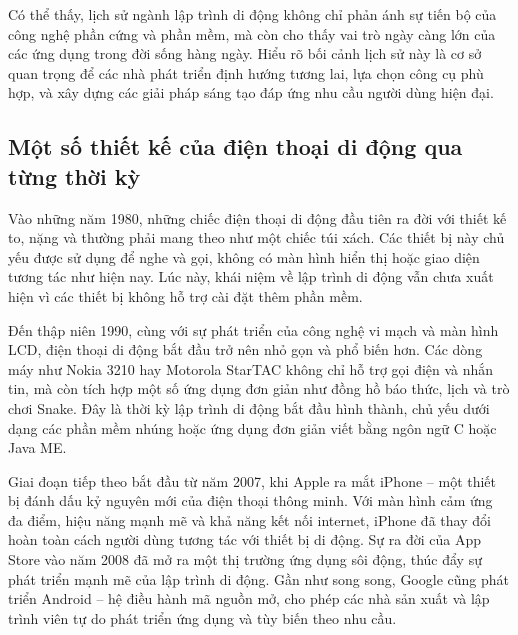 \begin{flushleft}
  \hspace*{0.8cm}Có thể thấy, lịch sử ngành lập trình di động không chỉ phản ánh sự tiến bộ của công nghệ phần cứng và phần mềm, mà còn cho thấy vai trò ngày càng lớn của các ứng dụng trong đời sống hàng ngày. Hiểu rõ bối cảnh lịch sử này là cơ sở quan trọng để các nhà phát triển định hướng tương lai, lựa chọn công cụ phù hợp, và xây dựng các giải pháp sáng tạo đáp ứng nhu cầu người dùng hiện đại.
\end{flushleft}

\subsection{Một số thiết kế của điện thoại di động qua từng thời kỳ}
\renewcommand{\labelitemi}{--}    
    \begin{flushleft}
        \hspace*{0.8cm}Vào những năm 1980, những chiếc điện thoại di động đầu tiên ra đời với thiết kế to, nặng và thường phải mang theo như một chiếc túi xách. Các thiết bị này chủ yếu được sử dụng để nghe và gọi, không có màn hình hiển thị hoặc giao diện tương tác như hiện nay. Lúc này, khái niệm về lập trình di động vẫn chưa xuất hiện vì các thiết bị không hỗ trợ cài đặt thêm phần mềm.
    \end{flushleft}

    \begin{flushleft}
      \hspace*{0.8cm}Đến thập niên 1990, cùng với sự phát triển của công nghệ vi mạch và màn hình LCD, điện thoại di động bắt đầu trở nên nhỏ gọn và phổ biến hơn. Các dòng máy như Nokia 3210 hay Motorola StarTAC không chỉ hỗ trợ gọi điện và nhắn tin, mà còn tích hợp một số ứng dụng đơn giản như đồng hồ báo thức, lịch và trò chơi Snake. Đây là thời kỳ lập trình di động bắt đầu hình thành, chủ yếu dưới dạng các phần mềm nhúng hoặc ứng dụng đơn giản viết bằng ngôn ngữ C hoặc Java ME.
  \end{flushleft}

  \begin{flushleft}
    \hspace*{0.8cm}Giai đoạn tiếp theo bắt đầu từ năm 2007, khi Apple ra mắt iPhone – một thiết bị đánh dấu kỷ nguyên mới của điện thoại thông minh. Với màn hình cảm ứng đa điểm, hiệu năng mạnh mẽ và khả năng kết nối internet, iPhone đã thay đổi hoàn toàn cách người dùng tương tác với thiết bị di động. Sự ra đời của App Store vào năm 2008 đã mở ra một thị trường ứng dụng sôi động, thúc đẩy sự phát triển mạnh mẽ của lập trình di động. Gần như song song, Google cũng phát triển Android – hệ điều hành mã nguồn mở, cho phép các nhà sản xuất và lập trình viên tự do phát triển ứng dụng và tùy biến theo nhu cầu.
\end{flushleft}

